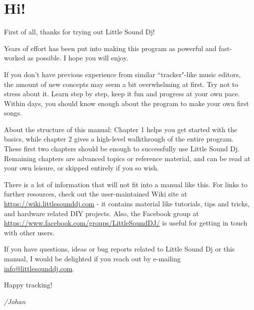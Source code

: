 \chapter*{Hi!}
First of all, thanks for trying out Little Sound Dj!

Years of effort has been put into making this program as powerful and fast-worked as possible. I hope you will enjoy.

If you don't have previous experience from similar ``tracker"-like music editors, the amount of new concepts may seem a bit overwhelming at first.  Try not to stress about it. Learn step by step, keep it fun and progress at your own pace. Within days, you should know enough about the program to make your own first songs.

About the structure of this manual: Chapter 1 helps you get started with the basics, while chapter 2 gives a high-level walkthrough of the entire program. These first two chapters should be enough to successfully use Little Sound Dj. Remaining chapters are advanced topics or reference material, and can be read at your own leisure, or skipped entirely if you so wish.

There is a lot of information that will not fit into a manual like this. For links to further resources, check out the user-maintained Wiki site at \url{https://wiki.littlesounddj.com} - it contains material like tutorials, tips and tricks, and hardware related DIY projects. Also, the Facebook group at \url{https://www.facebook.com/groups/LittleSoundDJ/} is useful for getting in touch
with other users.

If you have questions, ideas or bug reports related to Little Sound Dj or this manual, I would be delighted if you reach out by e-mailing \href{mailto:info@littlesounddj.com}{info@littlesounddj.com}.

Happy tracking!

\textit{/Johan}

